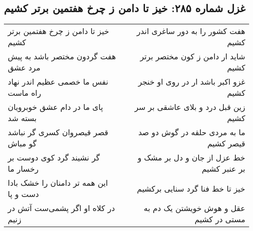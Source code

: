 \begin{center}
\section*{غزل شماره ۲۸۵: خیز تا دامن ز چرخ هفتمین برتر کشیم}
\label{sec:285}
\begin{longtable}{l p{0.5cm} r}
خیز تا دامن ز چرخ هفتمین برتر کشیم
&&
هفت کشور را به دور ساغری اندر کشیم
\\
هفت گردون مختصر باشد به پیش مرد عشق
&&
شاید ار دامن ز کون مختصر برتر کشیم
\\
نفس ما خصمی عظیم اندر نهاد راه ماست
&&
غزو اکبر باشد ار در روی او خنجر کشیم
\\
پای ما در دام عشق خوبرویان بسته شد
&&
زین قبل درد و بلای عاشقی بر سر کشیم
\\
قصر قیصروان کسری گر نباشد گو مباش
&&
ما به مردی حلقه در گوش دو صد قیصر کشیم
\\
گر نشیند گرد کوی دوست بر رخسار ما
&&
خط عزل از جان و دل بر مشک و بر عنبر کشیم
\\
این همه تر دامنان را خشک بادا دست و پا
&&
خیز تا خط فنا گرد سنایی برکشیم
\\
در کلاه او اگر پشمی‌ست آتش در زنیم
&&
عقل و هوش خویشتن یک دم به مستی در کشیم
\\
\end{longtable}
\end{center}
